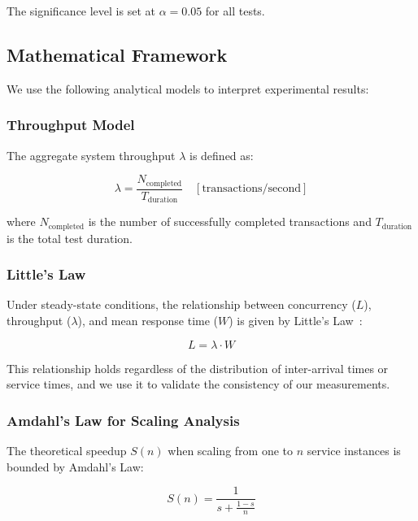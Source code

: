 \documentclass[journal]{IEEEtran}
\begin{document}
The significance level is set at $\alpha = 0.05$ for all tests.

\subsection{Mathematical Framework}
\label{subsec:math_framework}

We use the following analytical models to interpret experimental results:

\subsubsection{Throughput Model}

The aggregate system throughput $\lambda$ is defined as:

\begin{equation}
\lambda = \frac{N_{\text{completed}}}{T_{\text{duration}}} \quad [\text{transactions/second}]
\label{eq:throughput}
\end{equation}

where $N_{\text{completed}}$ is the number of successfully completed transactions and $T_{\text{duration}}$ is the total test duration.

\subsubsection{Little's Law}

Under steady-state conditions, the relationship between concurrency ($L$), throughput ($\lambda$), and mean response time ($W$) is given by Little's Law~\cite{little1961proof}:

\begin{equation}
L = \lambda \cdot W
\label{eq:littles_law}
\end{equation}

This relationship holds regardless of the distribution of inter-arrival times or service times, and we use it to validate the consistency of our measurements.

\subsubsection{Amdahl's Law for Scaling Analysis}

The theoretical speedup $S(n)$ when scaling from one to $n$ service instances is bounded by Amdahl's Law:

\begin{equation}
S(n) = \frac{1}{s + \frac{1-s}{n}}
\label{eq:amdahl}
\end{equation}
\end{document}
